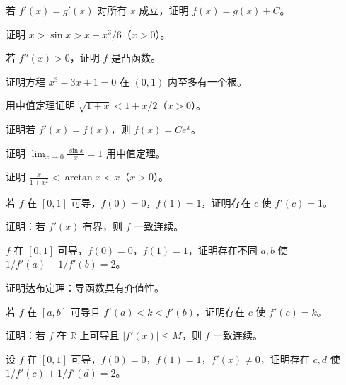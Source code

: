 \begin{exercise}[3] 若 \(f'(x)=g'(x)\) 对所有 \(x\) 成立，证明 \(f(x)=g(x)+C\)。\end{exercise}
\begin{exercise}[3] 证明 \(x > \sin x > x - x^3/6\)（\(x>0\)）。\end{exercise}
\begin{exercise}[4] 若 \(f''(x)>0\)，证明 \(f\) 是凸函数。\end{exercise}
\begin{exercise}[4] 证明方程 \(x^3-3x+1=0\) 在 \((0,1)\) 内至多有一个根。\end{exercise}
\begin{exercise}[4] 用中值定理证明 \(\sqrt{1+x} < 1 + x/2\)（\(x>0\)）。\end{exercise}
\begin{exercise}[4] 证明若 \(f'(x)=f(x)\)，则 \(f(x)=Ce^x\)。\end{exercise}
\begin{exercise}[4] 证明 \(\lim_{x\to0} \frac{\sin x}{x}=1\) 用中值定理。\end{exercise}
\begin{exercise}[5] 证明 \(\frac{x}{1+x^2} < \arctan x < x\)（\(x>0\)）。\end{exercise}
\begin{exercise}[5] 若 \(f\) 在 \([0,1]\) 可导，\(f(0)=0\)，\(f(1)=1\)，证明存在 \(c\) 使 \(f'(c)=1\)。\end{exercise}
\begin{exercise}[5] 证明：若 \(f'(x)\) 有界，则 \(f\) 一致连续。\end{exercise}
\begin{exercise}[5] \(f\) 在 \([0,1]\) 可导，\(f(0)=0\)，\(f(1)=1\)，证明存在不同 \(a,b\) 使 \(1/f'(a)+1/f'(b)=2\)。\end{exercise}
\begin{exercise}[6] 证明达布定理：导函数具有介值性。\end{exercise}
\begin{exercise}[6] 若 \(f\) 在 \([a,b]\) 可导且 \(f'(a)<k<f'(b)\)，证明存在 \(c\) 使 \(f'(c)=k\)。\end{exercise}
\begin{exercise}[6] 证明：若 \(f\) 在 \(\mathbb{R}\) 上可导且 \(|f'(x)|\le M\)，则 \(f\) 一致连续。\end{exercise}
\begin{exercise}[7] 设 \(f\) 在 \([0,1]\) 可导，\(f(0)=0\)，\(f(1)=1\)，\(f'(x)\neq0\)，证明存在 \(c,d\) 使 \(1/f'(c)+1/f'(d)=2\)。\end{exercise}
